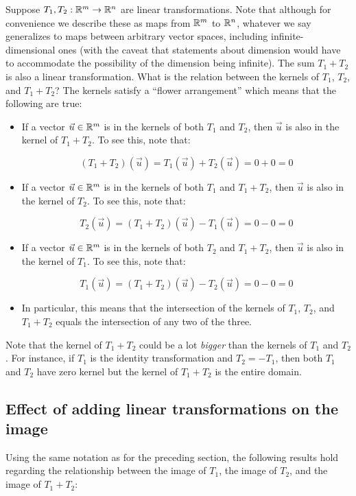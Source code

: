 \documentclass[10pt]{amsart}
\begin{document}
Suppose $T_1,T_2:\mathbb{R}^m \to \mathbb{R}^n$ are linear transformations. Note that
although for convenience we describe these as maps from $\mathbb{R}^m$ to
$\mathbb{R}^n$, whatever we say generalizes to maps between arbitrary vector
spaces, including infinite-dimensional ones (with the caveat that
statements about dimension would have to accommodate the possibility
of the dimension being infinite). The sum $T_1 + T_2$ is also a linear
transformation. What is the relation between the kernels of $T_1$,
$T_2$, and $T_1 + T_2$? The kernels satisfy a ``flower arrangement''
which means that the following are true:

\begin{itemize}
\item If a vector $\vec{u} \in \mathbb{R}^m$ is in the kernels of both $T_1$
  and $T_2$, then $\vec{u}$ is also in the kernel of $T_1 + T_2$. To
  see this, note that:

  $$(T_1 + T_2)(\vec{u}) = T_1(\vec{u}) + T_2(\vec{u}) = 0 + 0 = 0$$
\item If a vector $\vec{u} \in \mathbb{R}^m$ is in the kernels of both $T_1$
  and $T_1 + T_2$, then $\vec{u}$ is also in the kernel of $T_2$. To
  see this, note that:

  $$T_2(\vec{u}) = (T_1 + T_2)(\vec{u}) - T_1(\vec{u}) = 0 - 0 = 0$$
\item If a vector $\vec{u} \in \mathbb{R}^m$ is in the kernels of both $T_2$
  and $T_1 + T_2$, then $\vec{u}$ is also in the kernel of $T_1$. To
  see this, note that:

  $$T_1(\vec{u}) = (T_1 + T_2)(\vec{u}) - T_2(\vec{u}) = 0 - 0 = 0$$
\item In particular, this means that the intersection of the kernels
  of $T_1$, $T_2$, and $T_1 + T_2$ equals the intersection of any two
  of the three.
\end{itemize}

Note that the kernel of $T_1 + T_2$ could be a lot {\em bigger} than
the kernels of $T_1$ and $T_2$. For instance, if $T_1$ is the identity
transformation and $T_2 = -T_1$, then both $T_1$ and $T_2$ have zero
kernel but the kernel of $T_1 + T_2$ is the entire domain.

\subsection{Effect of adding linear transformations on the image}

Using the same notation as for the preceding section, the following
results hold regarding the relationship between the image of $T_1$,
the image of $T_2$, and the image of $T_1 + T_2$:
\end{document}
